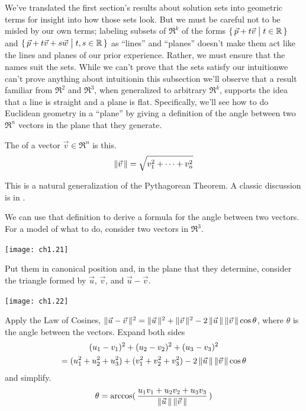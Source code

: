 We've translated the first section's results about solution sets into
geometric terms for insight into how those sets look.
But we must be careful not to be misled by our own terms; labeling subsets of
\( \Re^k \) of the forms
\( \mbox{$\{\,\vec{p}+t\vec{v}\bigm| t\in\mathbb{R}\,\}$} \) and
\( \mbox{$\{\,\vec{p}+t\vec{v}+s\vec{w}\bigm| t,s\in\mathbb{R}\,\}$} \)
as ``lines'' and ``planes'' doesn't make them act like the lines
and planes of our prior experience.
Rather, we must ensure that the names suit the sets.
While we can't prove that the sets satisfy our intuition\Dash we can't
prove anything about intuition\Dash in this subsection we'll observe that
a result familiar from \( \Re^2 \) and \( \Re^3 \), when generalized to
arbitrary \( \Re^k \), supports the idea that a line is straight
and a plane is flat.
Specifically, we'll see how to do Euclidean geometry in a ``plane'' by giving
a definition of the angle between two $\Re^n$ vectors in the plane that they
generate.

\begin{definition}
The  of a vector
\( \vec{v}\in\Re^n \) is this.
\begin{equation*}
  \|\vec{v}\,\|=\sqrt{v_1^2+\cdots+v_n^2}
\end{equation*}
\end{definition}

\begin{remark}
This is a natural generalization of the Pythagorean Theorem.
A classic discussion is in \cite{PatternsPlausInf}.
\end{remark}

We can use that definition to derive a formula 
for the angle between two vectors.
For a model of what to do, consider two vectors in \( \Re^3 \).
\begin{center}
  \texttt{[image: ch1.21]}
\end{center}
Put them in canonical position
and, in the plane that they determine, consider the triangle formed by
\( \vec{u} \), \( \vec{v} \), and \( \vec{u}-\vec{v} \).
\begin{center}
  \texttt{[image: ch1.22]}
\end{center}
Apply the Law of Cosines,
$\|\vec{u}-\vec{v}\,\|^2
  =
  \|\vec{u}\,\|^2+\|\vec{v}\,\|^2-
    2\,\|\vec{u}\,\|\,\|\vec{v}\,\|\cos\theta$, 
where \( \theta \) is the angle between the vectors.
Expand both sides
\begin{multline*}
  (u_1-v_1)^2+(u_2-v_2)^2+(u_3-v_3)^2  \\
  =(u_1^2+u_2^2+u_3^2)+(v_1^2+v_2^2+v_3^2)-
     2\,\|\vec{u}\,\|\,\|\vec{v}\,\|\cos\theta
\end{multline*}
and simplify.
\begin{equation*}
  \theta
  =
  \arccos(\,\frac{u_1v_1+u_2v_2+u_3v_3}{
         \|\vec{u}\,\|\,\|\vec{v}\,\| }\,)
\end{equation*}

